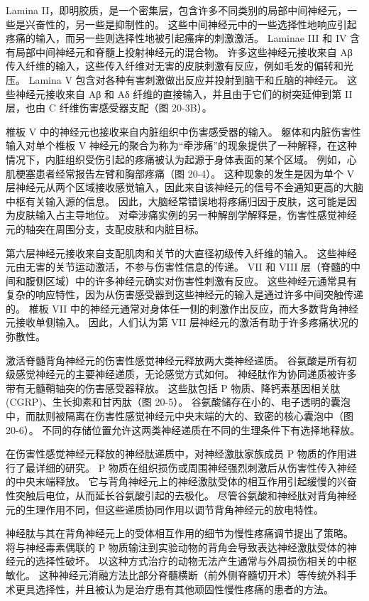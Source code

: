 Lamina II，即明胶质，是一个密集层，包含许多不同类别的局部中间神经元，一些是兴奋性的，另一些是抑制性的。 这些中间神经元中的一些选择性地响应引起疼痛的输入，而另一些则选择性地被引起瘙痒的刺激激活。 Laminae III 和 IV 含有局部中间神经元和脊髓上投射神经元的混合物。 许多这些神经元接收来自 Aβ 传入纤维的输入，这些传入纤维对无害的皮肤刺激有反应，例如毛发的偏转和光压。 Lamina V 包含对各种有害刺激做出反应并投射到脑干和丘脑的神经元。 这些神经元接收来自 Aβ 和 Aδ 纤维的直接输入，并且由于它们的树突延伸到第 II 层，也由 C 纤维伤害感受器支配（图 20-3B）。

椎板 V 中的神经元也接收来自内脏组织中伤害感受器的输入。 躯体和内脏伤害性输入对单个椎板 V 神经元的聚合为称为“牵涉痛”的现象提供了一种解释，在这种情况下，内脏组织受伤引起的疼痛被认为起源于身体表面的某个区域。 例如，心肌梗塞患者经常报告左臂和胸部疼痛（图 20-4）。 这种现象的发生是因为单个 V 层神经元从两个区域接收感觉输入，因此来自该神经元的信号不会通知更高的大脑中枢有关输入源的信息。 因此，大脑经常错误地将疼痛归因于皮肤，这可能是因为皮肤输入占主导地位。 对牵涉痛实例的另一种解剖学解释是，伤害性感觉神经元的轴突在周围分支，支配皮肤和内脏目标。

第六层神经元接收来自支配肌肉和关节的大直径初级传入纤维的输入。 这些神经元由无害的关节运动激活，不参与伤害性信息的传递。 VII 和 VIII 层（脊髓的中间和腹侧区域）中的许多神经元确实对伤害性刺激有反应。 这些神经元通常具有复杂的响应特性，因为从伤害感受器到这些神经元的输入是通过许多中间突触传递的。 椎板 VII 中的神经元通常对身体任一侧的刺激作出反应，而大多数背角神经元接收单侧输入。 因此，人们认为第 VII 层神经元的激活有助于许多疼痛状况的弥散性。

激活脊髓背角神经元的伤害性感觉神经元释放两大类神经递质。 谷氨酸是所有初级感觉神经元的主要神经递质，无论感觉方式如何。 神经肽作为协同递质被许多带有无髓鞘轴突的伤害感受器释放。 这些肽包括 P 物质、降钙素基因相关肽 (CGRP)、生长抑素和甘丙肽（图 20-5）。 谷氨酸储存在小的、电子透明的囊泡中，而肽则被隔离在伤害性感觉神经元中央末端的大的、致密的核心囊泡中（图 20-6）。 不同的存储位置允许这两类神经递质在不同的生理条件下有选择地释放。

在伤害性感觉神经元释放的神经肽递质中，对神经激肽家族成员 P 物质的作用进行了最详细的研究。 P 物质在组织损伤或周围神经强烈刺激后从伤害性传入神经的中央末端释放。 它与背角神经元上的神经激肽受体的相互作用引起缓慢的兴奋性突触后电位，从而延长谷氨酸引起的去极化。 尽管谷氨酸和神经肽对背角神经元的生理作用不同，但这些递质协同作用以调节背角神经元的放电特性。

神经肽与其在背角神经元上的受体相互作用的细节为慢性疼痛调节提出了策略。 将与神经毒素偶联的 P 物质输注到实验动物的背角会导致表达神经激肽受体的神经元的选择性破坏。 以这种方式治疗的动物无法产生通常与外周损伤相关的中枢敏化。 这种神经元消融方法比部分脊髓横断（前外侧脊髓切开术）等传统外科手术更具选择性，并且被认为是治疗患有其他顽固性慢性疼痛的患者的方法。



